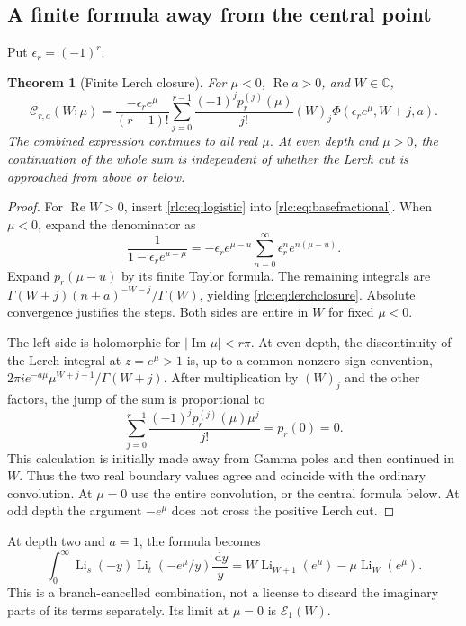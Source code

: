 \documentclass[11pt,a4paper]{article}
\numberwithin{equation}{section}
\newtheorem{theorem}{Theorem}[section]
\theoremstyle{definition}\newtheorem{definition}[theorem]{Definition}
\theoremstyle{remark}\newtheorem{remark}[theorem]{Remark}
\DeclareMathOperator{\Li}{Li}
\DeclareMathOperator{\Rea}{Re}
\DeclareMathOperator{\Ima}{Im}
\newcommand{\dd}{\,\mathrm d}
\newcommand{\C}{\mathbb C}\newcommand{\R}{\mathbb R}\newcommand{\N}{\mathbb N}
\newcommand{\E}{\mathcal E}
\newcommand{\CC}{\mathcal C}
\begin{document}
\subsection{A finite formula away from the central point}
Put $\epsilon_r=(-1)^r$.
\begin{theorem}[Finite Lerch closure]\label{rlc:thm:lerch}
For $\mu<0$, $\Rea a>0$, and $W\in\C$,
\begin{equation}\label{rlc:eq:lerchclosure}
 \boxed{\displaystyle
 \CC_{r,a}(W;\mu)=
 \frac{-\epsilon_r e^\mu}{(r-1)!}
 \sum_{j=0}^{r-1}\frac{(-1)^j p_r^{(j)}(\mu)}{j!}
 (W)_j\Phi(\epsilon_r e^\mu,W+j,a).}
\end{equation}
The combined expression continues to all real $\mu$. At even depth and
$\mu>0$, the continuation of the \emph{whole sum} is independent of
whether the Lerch cut is approached from above or below.
\end{theorem}
\begin{proof}
For $\Rea W>0$, insert \eqref{rlc:eq:logistic} into
\eqref{rlc:eq:basefractional}. When $\mu<0$, expand the denominator as
\[
 \frac1{1-\epsilon_r e^{u-\mu}}
 =-\epsilon_r e^{\mu-u}
       \sum_{n=0}^\infty\epsilon_r^n e^{n(\mu-u)}.
\]
Expand $p_r(\mu-u)$ by its finite Taylor formula. The remaining
integrals are
$\Gamma(W+j)(n+a)^{-W-j}/\Gamma(W)$, yielding
\eqref{rlc:eq:lerchclosure}. Absolute convergence justifies the steps.
Both sides are entire in $W$ for fixed $\mu<0$.

The left side is holomorphic for $|\Ima\mu|<r\pi$. At even depth,
the discontinuity of the Lerch integral at $z=e^\mu>1$ is, up to a
common nonzero sign convention,
$2\pi i e^{-a\mu}\mu^{W+j-1}/\Gamma(W+j)$.
After multiplication by $(W)_j$ and the other factors, the jump of the
sum is proportional to
\[
 \sum_{j=0}^{r-1}\frac{(-1)^j p_r^{(j)}(\mu)\mu^j}{j!}
 =p_r(0)=0.
\]
This calculation is initially made away from Gamma poles and then
continued in $W$. Thus the two real boundary values agree and coincide
with the ordinary convolution. At $\mu=0$ use the entire convolution,
or the central formula below. At odd depth the argument
$-e^\mu$ does not cross the positive Lerch cut.
\end{proof}

At depth two and $a=1$, the formula becomes
\begin{equation}\label{rlc:eq:fugacity2}
 \int_0^\infty\Li_s(-y)\Li_t(-e^\mu/y)\frac{\dd y}{y}
 =W\Li_{W+1}(e^\mu)-\mu\Li_W(e^\mu).
\end{equation}
This is a branch-cancelled combination, not a license to discard the
imaginary parts of its terms separately. Its limit at $\mu=0$ is
$\E_1(W)$.
\end{document}
